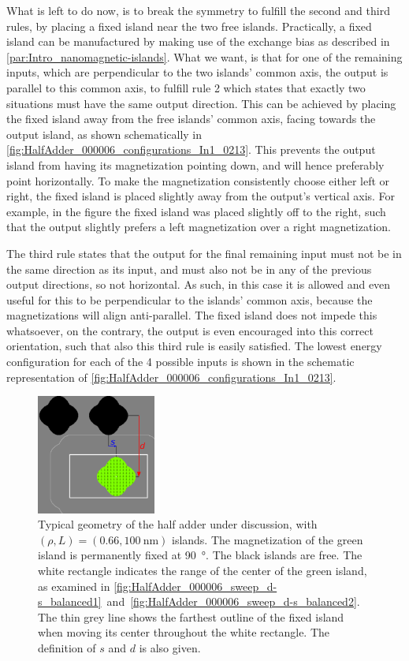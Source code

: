 \documentclass[11pt,a4paper,english]{article}
\begin{document}
What is left to do now, is to break the symmetry to fulfill the second and third rules, by placing a fixed island near the two free islands. Practically, a fixed island can be manufactured by making use of the exchange bias as described in \cref{par:Intro_nanomagnetic-islands}. What we want, is that for one of the remaining inputs, which are perpendicular to the two islands' common axis, the output is parallel to this common axis, to fulfill rule 2 which states that exactly two situations must have the same output direction. This can be achieved by placing the fixed island away from the free islands' common axis, facing towards the output island, as shown schematically in \cref{fig:HalfAdder_000006_configurations_In1_0213}. This prevents the output island from having its magnetization pointing down, and will hence preferably point horizontally. To make the magnetization consistently choose either left or right, the fixed island is placed slightly away from the output's vertical axis. For example, in the figure the fixed island was placed slightly off to the right, such that the output slightly prefers a left magnetization over a right magnetization. \par
The third rule states that the output for the final remaining input must not be in the same direction as its input, and must also not be in any of the previous output directions, so not horizontal. As such, in this case it is allowed and even useful for this to be perpendicular to the islands' common axis, because the magnetizations will align anti-parallel. The fixed island does not impede this whatsoever, on the contrary, the output is even encouraged into this correct orientation, such that also this third rule is easily satisfied. The lowest energy configuration for each of the 4 possible inputs is shown in the schematic representation of \cref{fig:HalfAdder_000006_configurations_In1_0213}.

\begin{figure}[b!]
    \centering
    \includegraphics[width=0.35\textwidth]{Figures/half_adder/regions000006.pdf}
    \caption{Typical geometry of the half adder under discussion, with $(\rho, L) = (0.66, \SI{100}{\nano\metre})$ islands. The magnetization of the green island is permanently fixed at \SI{90}{\degree}. The black islands are free. The white rectangle indicates the range of the center of the green island, as examined in \cref{fig:HalfAdder_000006_sweep_d-s_balanced1}~and~\ref{fig:HalfAdder_000006_sweep_d-s_balanced2}. The thin grey line shows the farthest outline of the fixed island when moving its center throughout the white rectangle. The definition of $s$ and $d$ is also given.}
    \label{fig:HalfAdder_000006_geometryTypical}
\end{figure}
\end{document}
